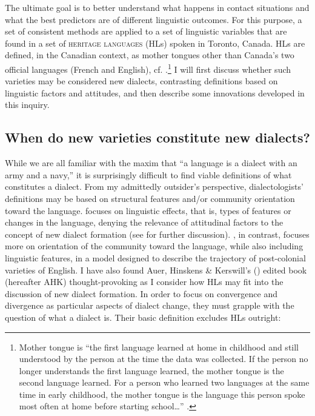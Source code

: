 \documentclass[output=paper]{LSP/langsci}
\begin{document}
The ultimate goal is to better understand what happens in contact situations and what the best predictors are of different linguistic outcomes. For this purpose, a set of consistent methods are applied to a set of linguistic variables that are found in a set of \textsc{heritage languages} (HLs) spoken in Toronto, Canada. HLs are defined, in the Canadian context, as mother tongues other than Canada’s two official languages (French and English), cf. \citet{cummins_lifting_1990}.\footnote{Mother tongue is “the first language learned at home in childhood and still understood by the person at the time the data was collected. If the person no longer understands the first language learned, the mother tongue is the second language learned. For a person who learned two languages at the same time in early childhood, the mother tongue is the language this person spoke most often at home before starting school…” \citep{statistics_canada_mother_2014}.} I will first discuss whether such varieties may be considered new dialects, contrasting definitions based on linguistic factors and attitudes, and then describe some innovations developed in this inquiry.

\subsection{When do new varieties constitute new dialects?}
While we are all familiar with the maxim that “a language is a dialect with an army and a navy,” it is surprisingly difficult to find viable definitions of what constitutes a dialect. From my admittedly outsider’s perspective, dialectologists’ definitions may be based on structural features and/or community orientation toward the language. \citet{trudgill_dialects_1986,trudgill_new-dialect_2004} focuses on linguistic effects, that is, types of features or changes in the language, denying the relevance of attitudinal factors to the concept of new dialect formation (see \citealt[186]{meyerhoff_linguistic_2006} for further discussion). \citet{schneider_dynamics_2003, schneider_postcolonial_2007}, in contrast, focuses more on orientation of the community toward the language, while also including linguistic features, in a model designed to describe the trajectory of post-colonial varieties of English. I have also found Auer, Hinskens \& Kerswill’s (\citeyear{auer_dialect_2004}) edited book (hereafter AHK) thought-provoking as I consider how HLs may fit into the discussion of new dialect formation. In order to focus on convergence and divergence as particular aspects of dialect change, they must grapple with the question of what a dialect is. Their basic definition excludes HLs outright:
\end{document}
